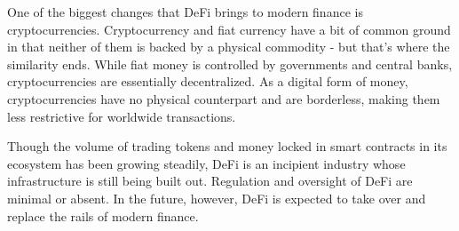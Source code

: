 One of the biggest changes that DeFi brings to modern finance is cryptocurrencies. Cryptocurrency and fiat currency have a bit of common ground in that neither of them is backed by a physical commodity - but that’s where the similarity ends. While fiat money is controlled by governments and central banks, cryptocurrencies are essentially decentralized. As a digital form of money, cryptocurrencies have no physical counterpart and are borderless, making them less restrictive for worldwide transactions.

Though the volume of trading tokens and money locked in smart contracts in its ecosystem has been growing steadily, DeFi is an incipient industry whose infrastructure is still being built out. Regulation and oversight of DeFi are minimal or absent. In the future, however, DeFi is expected to take over and replace the rails of modern finance.

\cleardoublepage